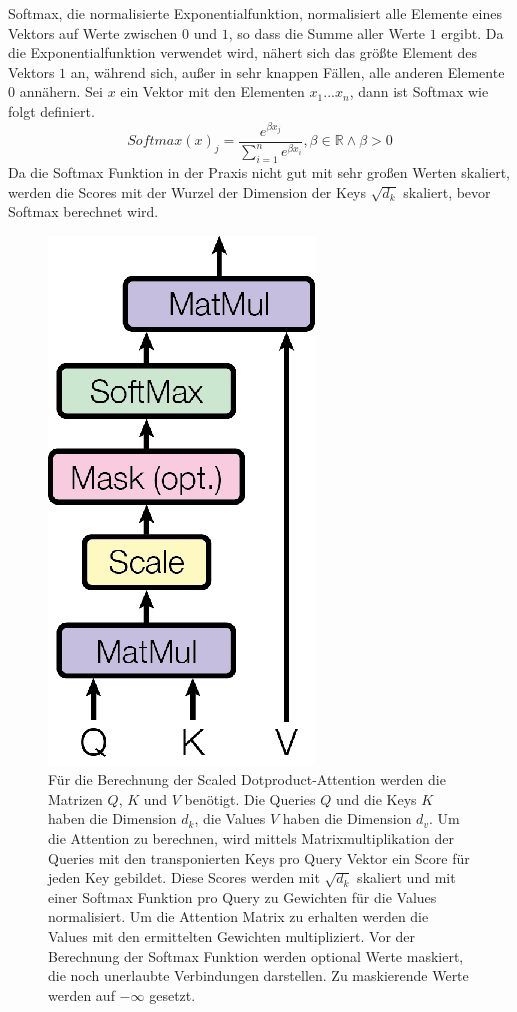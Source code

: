 \documentclass[conference]{IEEEtran}
\begin{document}
Softmax, die normalisierte Exponentialfunktion, normalisiert alle Elemente eines Vektors auf Werte zwischen $0$ und $1$, so dass die Summe aller Werte $1$ ergibt. Da die Exponentialfunktion verwendet wird, nähert sich das größte Element des Vektors $1$ an, während sich, außer in sehr knappen Fällen, alle anderen Elemente $0$ annähern. Sei $x$ ein Vektor mit den Elementen $x_1 ... x_n$, dann ist Softmax wie folgt definiert. \cite{softmax_to_softassign}
\begin{equation} \label{eq:softmax}
    Softmax(x)_j = \frac{e^{\beta x_j}}{\sum_{i = 1}^{n} e^{\beta x_i}}, \beta \in \mathbb{R} \land \beta > 0
\end{equation}
Da die Softmax Funktion in der Praxis nicht gut mit sehr großen Werten skaliert, werden die Scores mit der Wurzel der Dimension der Keys $\sqrt{d_k}$ skaliert, bevor Softmax berechnet wird. \cite{attention_is_all_you_need}

\begin{figure}[htbp]
\centerline{\includegraphics{img/scaled_dotproduct_attention.png}}
\caption{Für die Berechnung der Scaled Dotproduct-Attention werden die Matrizen $Q$, $K$ und $V$ benötigt. Die Queries $Q$ und die Keys $K$ haben die Dimension $d_k$, die Values $V$ haben die Dimension $d_v$. Um die Attention zu berechnen, wird mittels Matrixmultiplikation der Queries mit den transponierten Keys pro Query Vektor ein Score für jeden Key gebildet. Diese Scores werden mit $\sqrt{d_k}$ skaliert und mit einer Softmax Funktion pro Query zu Gewichten für die Values normalisiert. Um die Attention Matrix zu erhalten werden die Values mit den ermittelten Gewichten multipliziert. Vor der Berechnung der Softmax Funktion werden optional Werte maskiert, die noch unerlaubte Verbindungen darstellen. Zu maskierende Werte werden auf $-\infty$ gesetzt. \cite{attention_is_all_you_need}}
\label{fig:2}
\end{figure}
\end{document}
